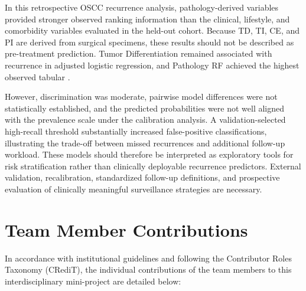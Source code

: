 \documentclass[11pt,a4paper]{article}
\newcommand{\ROC}{\text{ROC-AUC}}
\begin{document}
In this retrospective OSCC recurrence analysis, pathology-derived variables provided stronger observed ranking information than the clinical, lifestyle, and comorbidity variables evaluated in the held-out cohort. Because TD, TI, CE, and PI are derived from surgical specimens, these results should not be described as pre-treatment prediction. Tumor Differentiation remained associated with recurrence in adjusted logistic regression, and Pathology RF achieved the highest observed tabular \ROC{}.

However, discrimination was moderate, pairwise model differences were not statistically established, and the predicted probabilities were not well aligned with the prevalence scale under the calibration analysis. A validation-selected high-recall threshold substantially increased false-positive classifications, illustrating the trade-off between missed recurrences and additional follow-up workload. These models should therefore be interpreted as exploratory tools for risk stratification rather than clinically deployable recurrence predictors. External validation, recalibration, standardized follow-up definitions, and prospective evaluation of clinically meaningful surveillance strategies are necessary.

\section{Team Member Contributions}

In accordance with institutional guidelines and following the Contributor Roles Taxonomy (CRediT), the individual contributions of the team members to this interdisciplinary mini-project are detailed below:
\end{document}
